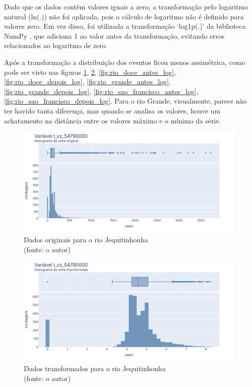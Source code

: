 Dado que os dados contêm valores iguais a zero, a transformação pelo logaritmo natural (ln(.)) não foi aplicada, pois o cálculo de logaritmo não é definido para valores zero. Em vez disso, foi utilizada a transformação `log1p(.)' da biblioteca NumPy \cite{numpyref}, que adiciona 1 ao valor antes da transformação, evitando erros relacionados ao logaritmo de zero.

Após a transformação a distribuição dos eventos ficou menos assimétrica, como pode ser visto nas figuras \ref{fig:jequitinhonha_antes_log}, \ref{fig:jequitinhonha_depois_log}, \ref{fig:rio_doce_antes_log}, \ref{fig:rio_doce_depois_log}, \ref{fig:rio_grande_antes_log}, \ref{fig:rio_grande_depois_log}, \ref{fig:rio_sao_francisco_antes_log}, \ref{fig:rio_sao_francisco_depois_log}. Para o rio Grande, visualmente, parece não ter havido tanta diferença, mas quando se analisa os valores, houve um achatamento na distância entre os valores máximo e o mínimo da série.

\begin{figure}[!h]
	\centering
	\includegraphics[scale=0.33]{Figuras/jequiti/jequitinhonha_antes_log.png}
	\caption{Dados originais para o rio Jequitinhonha\\(fonte: o autor)}
	\label{fig:jequitinhonha_antes_log}
\end{figure}

\begin{figure}[!h]
	\centering
	\includegraphics[scale=0.33]{Figuras/jequiti/jequitinhonha_depois_log.png}
	\caption{Dados transformados para o rio Jequitinhonha\\(fonte: o autor)}
	\label{fig:jequitinhonha_depois_log}
\end{figure}

